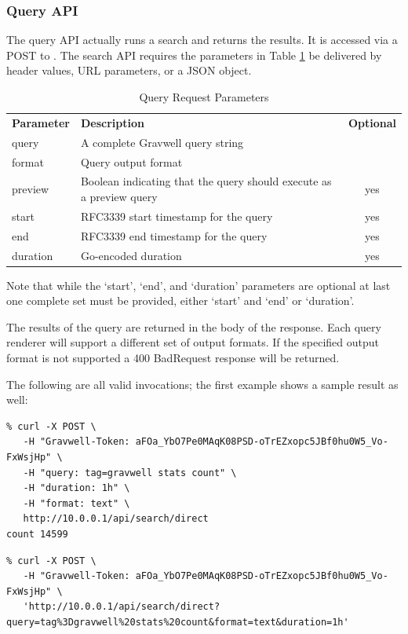 \subsubsection{Query API}
The query API actually runs a search and returns the results. It is accessed via a POST to . The search API requires the parameters in Table \ref{table:query-parameters} be delivered by header values, URL parameters, or a JSON object.

\begin{table}[H]
\begin{tabular}{llc}
\hline
\textbf{Parameter} & \textbf{Description} & \textbf{Optional} \\
query     & A complete Gravwell query string & \\
format    & Query output format & \\
preview   & Boolean indicating that the query should execute as a preview query & yes \\
start     & RFC3339 start timestamp for the query & yes \\
end       & RFC3339 end timestamp for the query & yes \\
duration  & Go-encoded duration & yes \\
\end{tabular}
\caption{Query Request Parameters}
\label{table:query-parameters}
\end{table}

Note that while the `start', `end', and `duration' parameters are optional at last one complete set must be provided, either `start' and `end' or `duration'.

The results of the query are returned in the body of the response. Each query renderer will support a different set of output formats. If the specified output format is not supported a 400 BadRequest response will be returned.

The following are all valid invocations; the first example shows a sample result as well:

\begin{verbatim}
% curl -X POST \
   -H "Gravwell-Token: aFOa_YbO7Pe0MAqK08PSD-oTrEZxopc5JBf0hu0W5_Vo-FxWsjHp" \
   -H "query: tag=gravwell stats count" \
   -H "duration: 1h" \
   -H "format: text" \
   http://10.0.0.1/api/search/direct
count 14599
\end{verbatim}

\begin{verbatim}
% curl -X POST \
   -H "Gravwell-Token: aFOa_YbO7Pe0MAqK08PSD-oTrEZxopc5JBf0hu0W5_Vo-FxWsjHp" \
   'http://10.0.0.1/api/search/direct?query=tag%3Dgravwell%20stats%20count&format=text&duration=1h'
\end{verbatim}


